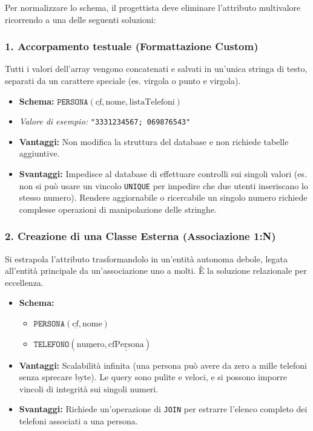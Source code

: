 Per normalizzare lo schema, il progettista deve eliminare l'attributo multivalore ricorrendo a una delle seguenti soluzioni:

\subsubsection*{1. Accorpamento testuale (Formattazione Custom)}
Tutti i valori dell'array vengono concatenati e salvati in un'unica stringa di testo, separati da un carattere speciale (es. virgola o punto e virgola).
\begin{itemize}
    \item \textbf{Schema:} $\texttt{PERSONA}(\underline{\text{cf}}, \text{nome}, \text{listaTelefoni})$ 
    \item \textit{Valore di esempio:} \texttt{"3331234567; 069876543"}
    \item \textbf{Vantaggi:} Non modifica la struttura del database e non richiede tabelle aggiuntive.
    \item \textbf{Svantaggi:} Impedisce al database di effettuare controlli sui singoli valori (es. non si può usare un vincolo \texttt{UNIQUE} per impedire che due utenti inseriscano lo stesso numero). Rendere aggiornabile o ricercabile un singolo numero richiede complesse operazioni di manipolazione delle stringhe.
\end{itemize}

\subsubsection*{2. Creazione di una Classe Esterna (Associazione 1:N)}
Si estrapola l'attributo trasformandolo in un'entità autonoma debole, legata all'entità principale da un'associazione uno a molti. È la soluzione relazionale per eccellenza.
\begin{itemize}
    \item \textbf{Schema:} 
    \begin{itemize}
        \item $\texttt{PERSONA}(\underline{\text{cf}}, \text{nome})$
        \item $\texttt{TELEFONO}(\underline{\text{numero}}, \underline{\underline{\text{cfPersona}}})$
    \end{itemize}
    \item \textbf{Vantaggi:} Scalabilità infinita (una persona può avere da zero a mille telefoni senza sprecare byte). Le query sono pulite e veloci, e si possono imporre vincoli di integrità sui singoli numeri.
    \item \textbf{Svantaggi:} Richiede un'operazione di \texttt{JOIN} per estrarre l'elenco completo dei telefoni associati a una persona.
\end{itemize}

